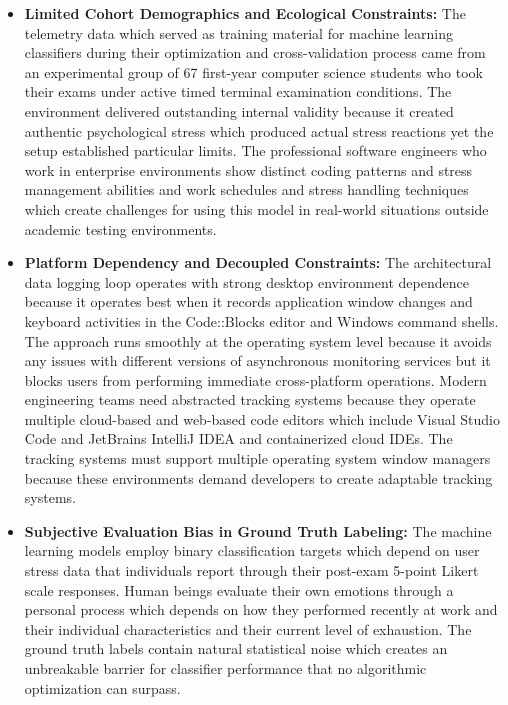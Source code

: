 \begin{itemize}
    \item \textbf{Limited Cohort Demographics and Ecological Constraints:} The telemetry data which served as training material for machine learning classifiers during their optimization and cross-validation process came from an experimental group of 67 first-year computer science students who took their exams under active timed terminal examination conditions. The environment delivered outstanding internal validity because it created authentic psychological stress which produced actual stress reactions yet the setup established particular limits. The professional software engineers who work in enterprise environments show distinct coding patterns and stress management abilities and work schedules and stress handling techniques which create challenges for using this model in real-world situations outside academic testing environments.

    \item \textbf{Platform Dependency and Decoupled Constraints:} The architectural data logging loop operates with strong desktop environment dependence because it operates best when it records application window changes and keyboard activities in the Code::Blocks editor and Windows command shells. The approach runs smoothly at the operating system level because it avoids any issues with different versions of asynchronous monitoring services but it blocks users from performing immediate cross-platform operations. Modern engineering teams need abstracted tracking systems because they operate multiple cloud-based and web-based code editors which include Visual Studio Code and JetBrains IntelliJ IDEA and containerized cloud IDEs. The tracking systems must support multiple operating system window managers because these environments demand developers to create adaptable tracking systems.

    \item \textbf{Subjective Evaluation Bias in Ground Truth Labeling:} The machine learning models employ binary classification targets which depend on user stress data that individuals report through their post-exam 5-point Likert scale responses. Human beings evaluate their own emotions through a personal process which depends on how they performed recently at work and their individual characteristics and their current level of exhaustion. The ground truth labels contain natural statistical noise which creates an unbreakable barrier for classifier performance that no algorithmic optimization can surpass.


\end{itemize}
